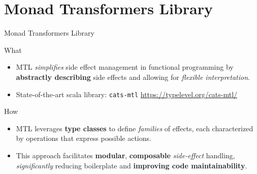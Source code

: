\documentclass[presentation, 10pt]{beamer}\mode<presentation>{\usetheme{metropolis}}
\begin{document}
\section{Monad Transformers Library}
\begin{frame}{Monad Transformers Library}
	\begin{exampleblock}{What}
		\begin{itemize}
			\item MTL \emph{simplifies} side effect management in functional programming by \textbf{abstractly describing} side effects and allowing for \emph{flexible interpretation}.
			\item State-of-the-art scala library: \texttt{cats-mtl} \url{https://typelevel.org/cats-mtl/}
		\end{itemize}
	\end{exampleblock}
	\begin{exampleblock}{How}
		\begin{itemize}
			\item MTL leverages \textbf{type classes} to define \emph{families} of effects, each characterized by operations that express possible actions.
		  \item This approach facilitates \textbf{modular}, \textbf{composable} \emph{side-effect} handling, \emph{significantly} reducing boilerplate and \textbf{improving code maintainability}.
		\end{itemize}
	\end{exampleblock}	
\end{frame}
\end{document}
